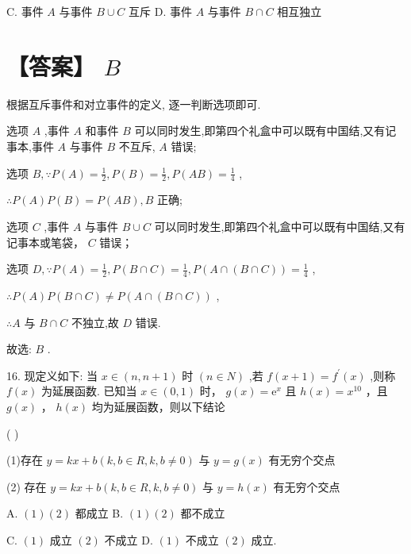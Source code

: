 \documentclass[10pt]{article}
\begin{document}
C. 事件 \(A\) 与事件 \(B \cup  C\) 互斥 D. 事件 \(A\) 与事件 \(B \cap  C\) 相互独立

\section*{【答案】 \(B\)}

根据互斥事件和对立事件的定义, 逐一判断选项即可.

选项 \(A\) ,事件 \(A\) 和事件 \(B\) 可以同时发生,即第四个礼盒中可以既有中国结,又有记事本,事件 \(A\) 与事件 \(B\) 不互斥, \(A\) 错误;

选项 \(B,\because P\left( A\right)  = \frac{1}{2},P\left( B\right)  = \frac{1}{2},P\left( {AB}\right)  = \frac{1}{4}\) ,

\(\therefore P\left( A\right) P\left( B\right)  = P\left( {AB}\right) ,B\) 正确;

选项 \(C\) ,事件 \(A\) 与事件 \(B \cup  C\) 可以同时发生,即第四个礼盒中可以既有中国结,又有记事本或笔袋， \(C\) 错误；

选项 \(D,\because P\left( A\right)  = \frac{1}{2},P\left( {B \cap  C}\right)  = \frac{1}{4},P\left( {A \cap  \left( {B \cap  C}\right) }\right)  = \frac{1}{4}\) ,

\(\therefore P\left( A\right) P\left( {B \cap  C}\right)  \neq  P\left( {A \cap  \left( {B \cap  C}\right) }\right)\) ,

\(\therefore A\) 与 \(B \cap  C\) 不独立,故 \(D\) 错误.

故选: \(B\) .

16. 现定义如下: 当 \(x \in  \left( {n,n + 1}\right)\) 时 \(\left( {n \in  N}\right)\) ,若 \(f\left( {x + 1}\right)  = {f}^{\prime }\left( x\right)\) ,则称 \(f\left( x\right)\) 为延展函数. 已知当 \(x \in  \left( {0,1}\right)\) 时， \(g\left( x\right)  = {\mathrm{e}}^{x}\) 且 \(h\left( x\right)  = {x}^{10}\) ，且 \(g\left( x\right)\) ， \(h\left( x\right)\) 均为延展函数，则以下结论

( )

(1)存在 \(y = {kx} + b\left( {k,b \in  R,k,b \neq  0}\right)\) 与 \(y = g\left( x\right)\) 有无穷个交点

(2) 存在 \(y = {kx} + b\left( {k,b \in  R,k,b \neq  0}\right)\) 与 \(y = h\left( x\right)\) 有无穷个交点

A. \(\left( 1\right) \left( 2\right)\) 都成立 B. \(\left( 1\right) \left( 2\right)\) 都不成立

C. \(\left( 1\right)\) 成立 \(\left( 2\right)\) 不成立 D. \(\left( 1\right)\) 不成立 \(\left( 2\right)\) 成立.
\end{document}
